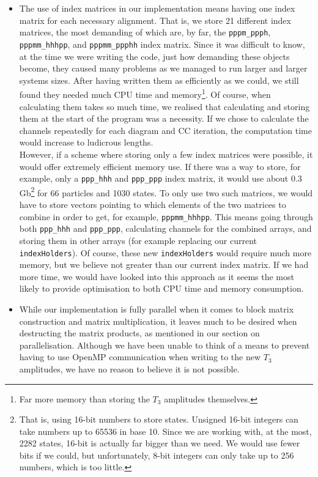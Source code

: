 \documentclass[10pt,twoside]{report}
\begin{document}
	\begin{itemize}
		\item The use of index matrices in our implementation means having one index matrix for each necessary alignment. That is, we store 21 different index matrices, the most demanding of which are, by far, the \texttt{pppm\_ppph}, \texttt{pppmm\_hhhpp}, and \texttt{pppmm\_ppphh} index matrix. Since it was difficult to know, at the time we were writing the code, just how demanding these objects become, they caused many problems as we managed to run larger and larger systems sizes. After having written them as efficiently as we could, we still found they needed much CPU time and memory\footnote{Far more memory than storing the $T_3$ amplitudes themselves.}. Of course, when calculating them takes so much time, we realised that calculating and storing them at the start of the program was a necessity. If we chose to calculate the channels repeatedly for each diagram and CC iteration, the computation time would increase to ludicrous lengths.\\
		
		However, if a scheme where storing only a few index matrices were possible, it would offer extremely efficient memory use. If there was a way to store, for example, only a \texttt{ppp\_hhh} and \texttt{ppp\_ppp} index matrix, it would use about 0.3 Gb\footnote{That is, using 16-bit numbers to store states. Unsigned 16-bit integers can take numbers up to  65536 in base 10. Since we are working with, at the most, 2282 states, 16-bit is actually far bigger than we need. We would use fewer bits if we could, but unfortunately, 8-bit integers can only take up to 256 numbers, which is too little.} for 66 particles and 1030 states. To only use two such matrices, we would have to store vectors pointing to which elements of the two matrices to combine in order to get, for example, \texttt{pppmm\_hhhpp}. This means going through both \texttt{ppp\_hhh} and \texttt{ppp\_ppp}, calculating channels for the combined arrays, and storing them in other arrays (for example replacing our current \texttt{indexHolders}). Of course, these new \texttt{indexHolders} would require much more memory, but we believe not greater than our current index matrix. If we had more time, we would have looked into this approach as it seems the most likely to provide optimisation to both CPU time and memory consumption.
		
		\item While our implementation is fully parallel when it comes to block matrix construction and matrix multiplication, it leaves much to be desired when destructing the matrix products, as mentioned in our section on parallelisation. Although we have been unable to think of a means to prevent having to use OpenMP communication when writing to the new $T_3$ amplitudes, we have no reason to believe it is not possible.
	\end{itemize}
	
\end{document}
